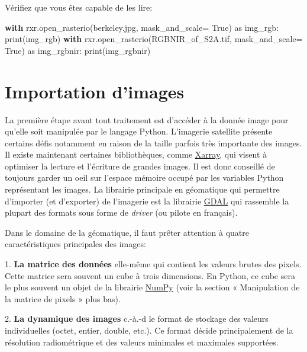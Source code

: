 \documentclass[
  french,
  11pt,
  letterpaper,
  open=any,
  twoside=false,
  french]{scrbook}
\newenvironment{Shaded}{\begin{snugshade}}{\end{snugshade}}
\newcommand{\BuiltInTok}[1]{\textcolor[rgb]{0.00,0.23,0.31}{#1}}
\newcommand{\ControlFlowTok}[1]{\textcolor[rgb]{0.00,0.23,0.31}{\textbf{#1}}}
\newcommand{\ImportTok}[1]{\textcolor[rgb]{0.00,0.46,0.62}{#1}}
\newcommand{\NormalTok}[1]{\textcolor[rgb]{0.00,0.23,0.31}{#1}}
\newcommand{\OperatorTok}[1]{\textcolor[rgb]{0.37,0.37,0.37}{#1}}
\newcommand{\StringTok}[1]{\textcolor[rgb]{0.13,0.47,0.30}{#1}}
\newcommand{\VariableTok}[1]{\textcolor[rgb]{0.07,0.07,0.07}{#1}}
\begin{document}
Vérifiez que vous êtes capable de les lire:

\begin{Shaded}
\begin{Highlighting}[]
\ControlFlowTok{with}\NormalTok{ rxr.open\_rasterio(}\StringTok{\textquotesingle{}berkeley.jpg\textquotesingle{}}\NormalTok{, mask\_and\_scale}\OperatorTok{=} \VariableTok{True}\NormalTok{) }\ImportTok{as}\NormalTok{ img\_rgb:}
    \BuiltInTok{print}\NormalTok{(img\_rgb)}
\ControlFlowTok{with}\NormalTok{ rxr.open\_rasterio(}\StringTok{\textquotesingle{}RGBNIR\_of\_S2A.tif\textquotesingle{}}\NormalTok{, mask\_and\_scale}\OperatorTok{=} \VariableTok{True}\NormalTok{) }\ImportTok{as}\NormalTok{ img\_rgbnir:}
    \BuiltInTok{print}\NormalTok{(img\_rgbnir)}
\end{Highlighting}
\end{Shaded}

\section{Importation d'images}\label{importation-dimages}

La première étape avant tout traitement est d'accéder à la donnée image
pour qu'elle soit manipulée par le langage Python. L'imagerie satellite
présente certains défis notamment en raison de la taille parfois très
importante des images. Il existe maintenant certaines bibliothèques,
comme \href{https://docs.xarray.dev/en/stable/}{Xarray}, qui visent à
optimiser la lecture et l'écriture de grandes images. Il est donc
conseillé de toujours garder un oeil sur l'espace mémoire occupé par les
variables Python représentant les images. La librairie principale en
géomatique qui permettre d'importer (et d'exporter) de l'imagerie est la
librairie \href{https://gdal.org}{GDAL} qui rassemble la plupart des
formats sous forme de \emph{driver} (ou pilote en français).

Dans le domaine de la géomatique, il faut prêter attention à quatre
caractéristiques principales des images:

1. \textbf{La matrice des données} elle-même qui contient les valeurs
brutes des pixels. Cette matrice sera souvent un cube à trois
dimensions. En Python, ce cube sera le plus souvent un objet de la
librairie \href{https://numpy.org/}{NumPy} (voir la section «
Manipulation de la matrice de pixels » plus bas).

2. \textbf{La dynamique des images} c.-à.-d le format de stockage des
valeurs individuelles (octet, entier, double, etc.). Ce format décide
principalement de la résolution radiométrique et des valeurs minimales
et maximales supportées.
\end{document}
